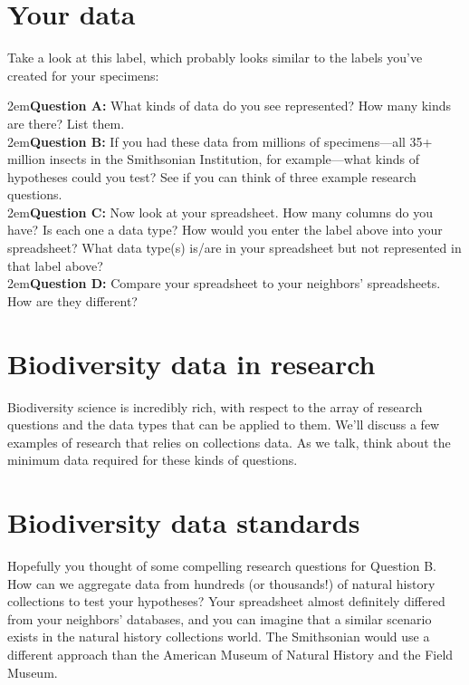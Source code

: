 \documentclass[11pt,letterpaper]{article}
\newenvironment{labelfontsmall}{\fontfamily{phv}\selectfont}{\par}%
\begin{document}
\section*{Your data}
Take a look at this label, which probably looks similar to the labels you've created for your specimens:\\

\begin{labelfontsmall}
\tiny
{}
\end{labelfontsmall}
\normalsize\vspace{5mm}

\hangindent2em\textbf{Question A:} What kinds of data do you see represented? How many kinds are there? List them.\\

\hangindent2em\textbf{Question B:} If you had these data from millions of specimens---all 35+ million insects in the Smithsonian Institution, for example---what kinds of hypotheses could you test? See if you can think of three example research questions.\\

\hangindent2em\textbf{Question C:} Now look at your spreadsheet. How many columns do you have? Is each one a data type? How would you enter the label above into your spreadsheet? What data type(s) is/are in your spreadsheet but not represented in that label above? \\

\hangindent2em\textbf{Question D:} Compare your spreadsheet to your neighbors' spreadsheets. How are they different?

\section*{Biodiversity data in research}
Biodiversity science is incredibly rich, with respect to the array of research questions and the data types that can be applied to them. We'll discuss a few examples of research that relies on collections data. As we talk, think about the minimum data required for these kinds of questions.

\section*{Biodiversity data standards}
Hopefully you thought of some compelling research questions for Question B. How can we aggregate data from hundreds (or thousands!) of natural history collections to test your hypotheses? Your spreadsheet almost definitely differed from your neighbors' databases, and you can imagine that a similar scenario exists in the natural history collections world. The Smithsonian would use a different approach than the American Museum of Natural History and the Field Museum. \\
\end{document}
